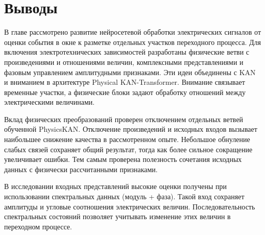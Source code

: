 \clearpage
\section{Выводы}
\label{sec:ch04_conclusions}

В главе рассмотрено развитие нейросетевой обработки
электрических сигналов от оценки события в окне
к разметке отдельных участков переходного процесса.
Для включения электротехнических зависимостей разработаны
физические ветви с произведениями и отношениями величин,
комплексными представлениями и фазовым управлением
амплитудными признаками. Эти идеи объединены с KAN
и вниманием в архитектуре Physical KAN-Transformer.
Внимание связывает временные участки, а физические
блоки задают обработку отношений между электрическими величинами.

{}
Вклад физических преобразований проверен отключением отдельных
ветвей обученной PhysicsKAN. Отключение произведений
и исходных входов вызывает наибольшее снижение качества
в рассмотренном опыте. Небольшое обнуление слабых связей
сохраняет общий результат, тогда как более сильное сокращение
увеличивает ошибки. Тем самым проверена полезность
сочетания исходных данных с физически рассчитанными признаками.

{}
В исследовании входных представлений высокие оценки получены
при использовании спектральных данных (модуль + фаза). Такой вход сохраняет
амплитуды и угловые соотношения электрических величин.
Последовательность спектральных состояний позволяет учитывать
изменение этих величин в переходном процессе.


